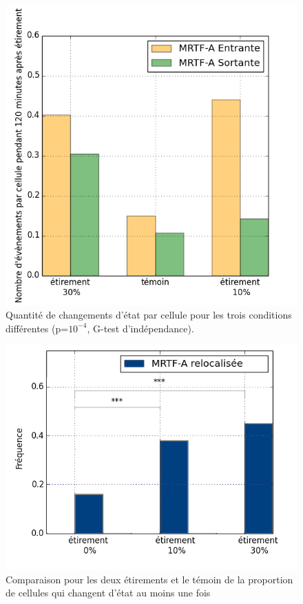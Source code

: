 \documentclass                                                                                                                                                                                                                                                                                                                                       {report}
\begin{document}
\begin{figure}[p]
\includegraphics[scale=0.5]{Figures/Etirement30_vs_temoin_activite.png}
\caption{\label{Et30_activite} Quantité de changements d'état par cellule pour les trois conditions différentes (p=$10^{-4}$, G-test d'indépendance).}
\end{figure}

\begin{figure}[p]
 \includegraphics[scale=0.5]{Figures/Activite.png} 
 \caption{\label{Et30_ES} Comparaison pour les deux étirements et le témoin de la proportion de cellules qui changent d'état au moins une fois}
 \end{figure}
 
\end{document}
